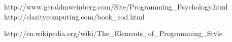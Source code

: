 \begin{center}
                    {http://www.geraldmweinberg.com/Site/Programming_Psychology.html}
                    {http://claritycomputing.com/book_sod.html}
                    

                    {http://en.wikipedia.org/wiki/The_Elements_of_Programming_Style}

\end{center}
